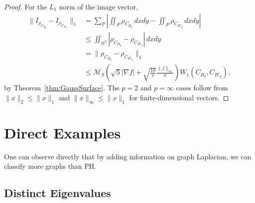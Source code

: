 \documentclass{article}
\begin{document}
\GaussianImageStability*

\begin{proof}
For the $L_1$ norm of the image vector,
    \begin{align*}
\|I_{\rho_{C_{B_q}}}-I_{\rho_{C_{B'_q}}}\|_1
&=\sum_P\left|\iint_P\rho_{C_{B_q}}\,dxdy-\iint_P\rho_{C_{B'_q}}\,dxdy\right|\\
&\leq\iint_{\mathbb R^2}|\rho_{C_{B_q}}-\rho_{C_{B'_q}}|\,dxdy\\
&=\|\rho_{C_{B_q}}-\rho_{C_{B'_q}}\|_1\\
&\leq\mathcal M_S
\left(\sqrt{5}|\nabla f|+\sqrt{\tfrac{10}{\pi}}\tfrac{\|f\|_\infty}{\sigma}\right)
W_1(C_{B_q},C_{B'_q}),
    \end{align*}
by Theorem~\ref{thm:GaussSurface}. The $p=2$ and $p=\infty$ cases follow from
$\|x\|_2\leq\|x\|_1$ and $\|x\|_\infty\leq\|x\|_1$ for finite-dimensional vectors.
\end{proof}


\section{Direct Examples} \label{sec: examples}

One can observe directly that by adding information on graph Laplacian, we can classify more graphs than PH.

\subsection{Distinct Eigenvalues}\label{sec: distinct eigenvalues}
\end{document}
